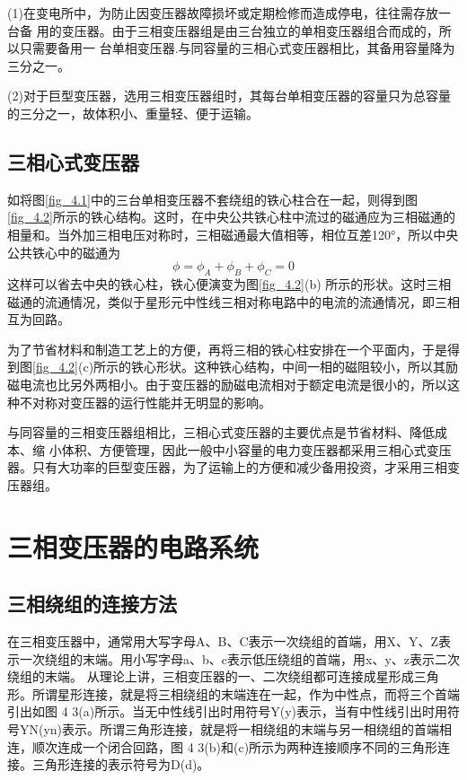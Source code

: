 \documentclass{book}
\begin{document}
(1)在变电所中，为防止因变压器故障损坏或定期检修而造成停电，往往需存放一台备 用的变压器。由于三相变压器组是由三台独立的单相变压器组合而成的，所以只需要备用一 台单相变压器.与同容量的三相心式变压器相比，其备用容量降为三分之一。

(2)对于巨型变压器，选用三相变压器组时，其每台单相变压器的容量只为总容量的三分之一，故体积小、重量轻、便于运输。
\subsection{三相心式变压器}

如将图\ref{fig_4.1}中的三台单相变压器不套绕组的铁心柱合在一起，则得到图\ref{fig_4.2}所示的铁心结构。这时，在中央公共铁心柱中流过的磁通应为三相磁通的相量和。当外加三相电压对称时，三相磁通最大值相等，相位互差120°，所以中央公共铁心中的磁通为
\begin{equation}
\phi ={{\phi }_{A}}+{{\phi }_{B}}+{{\phi }_{C}}=0
\label{3-57}
\end{equation}
这样可以省去中央的铁心柱，铁心便演变为图\ref{fig_4.2}(b) 所示的形状。这时三相磁通的流通情况，类似于星形元中性线三相对称电路中的电流的流通情况，即三相互为回路。

为了节省材料和制造工艺上的方便，再将三相的铁心柱安排在一个平面内，于是得到图\ref{fig_4.2}(c)所示的铁心形状。这种铁心结构，中间一相的磁阻较小，所以其励磁电流也比另外两相小。由于变压器的励磁电流相对于额定电流是很小的，所以这种不对称对变压器的运行性能并无明显的影响。

与同容量的三相变压器组相比，三相心式变压器的主要优点是节省材料、降低成本、缩 小体积、方便管理，因此一般中小容量的电力变压器都采用三相心式变压器。只有大功率的巨型变压器，为了运输上的方便和减少备用投资，才采用三相变压器组。


\section{三相变压器的电路系统}
\subsection{三相绕组的连接方法}
在三相变压器中，通常用大写字母A、B、C表示一次绕组的首端，用X、Y、Z表示一次绕组的末端。用小写字母a、b、c表示低压绕组的首端，用x、y、z表示二次绕组的末端。
从理论上讲，三相变压器的一、二次绕组都可连接成星形成三角形。所谓星形连接，就是将三相绕组的末端连在一起，作为中性点，而将三个首端引出如图 4 3(a)所示。当无中性线引出时用符号Y(y)表示，当有中性线引出时用符号YN(yn)表示。所谓三角形连接，就是将一相绕组的末端与另一相绕组的首端相连，顺次连成一个闭合回路，图 4 3(b)和(c)所示为两种连接顺序不同的三角形连接。三角形连接的表示符号为D(d)。
\end{document}
